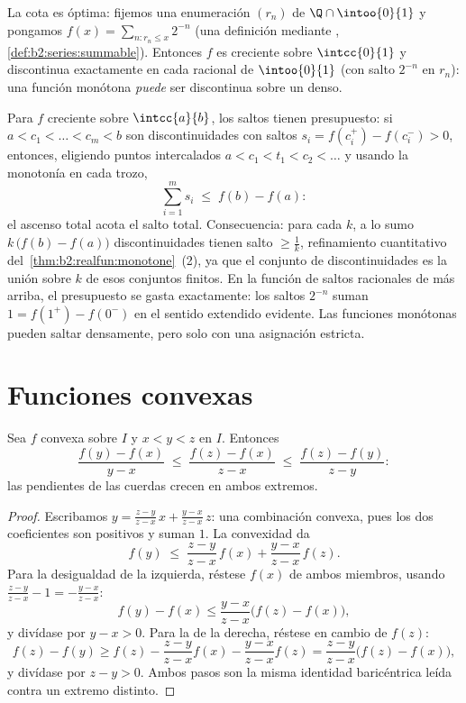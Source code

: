\begin{example}
La cota es óptima: fijemos una enumeración $(r_n)$ de $\Q \cap
\intoo{0}{1}$ y pongamos $f(x) = \sum_{n : r_n \leq x} 2^{-n}$ (una
definición mediante ,
\cref{def:b2:series:summable}). Entonces $f$ es creciente sobre
$\intcc{0}{1}$ y discontinua exactamente en cada racional de
$\intoo{0}{1}$ (con salto $2^{-n}$ en $r_n$): una función monótona
\emph{puede} ser discontinua sobre un  denso.
\end{example}

\begin{example}\label{ex:b2:realfun:jumpbudget}
Para $f$ creciente sobre $\intcc{a}{b}$, los saltos tienen
presupuesto: si $a < c_1 < \dots < c_m < b$ son discontinuidades
con saltos $s_i = f(c_i^+) - f(c_i^-) > 0$, entonces, eligiendo
puntos intercalados $a < c_1 < t_1 < c_2 < \dots$ y usando la
monotonía en cada trozo,
\[
\sum_{i=1}^{m} s_i \;\leq\; f(b) - f(a) :
\]
el ascenso total acota el salto total. Consecuencia: para cada $k$,
a lo sumo $k\,\bigl(f(b) - f(a)\bigr)$ discontinuidades tienen salto
$\geq \frac1k$, refinamiento cuantitativo del~\cref{thm:b2:realfun:monotone}~(2), ya que el conjunto de
discontinuidades es la unión  sobre $k$ de esos conjuntos
finitos. En la función de saltos racionales de más arriba, el
presupuesto se gasta exactamente: los saltos $2^{-n}$ suman $1 =
f(1^+) - f(0^-)$ en el sentido extendido evidente. Las funciones
monótonas pueden saltar densamente, pero solo con una asignación
estricta.
\end{example}

\section{Funciones convexas}

\begin{lemma}\label{lem:b2:realfun:slopes}
Sea $f$ convexa sobre $I$ y $x < y < z$ en $I$. Entonces
\[
\frac{f(y) - f(x)}{y - x}
\;\leq\; \frac{f(z) - f(x)}{z - x}
\;\leq\; \frac{f(z) - f(y)}{z - y} :
\]
las pendientes de las cuerdas crecen en ambos extremos.
\end{lemma}

\begin{proof}
Escribamos $y = \frac{z - y}{z - x}\,x + \frac{y - x}{z - x}\,z$:
una combinación convexa, pues los dos coeficientes son positivos y
suman $1$. La convexidad da
\[
f(y) \;\leq\; \frac{z-y}{z-x}\,f(x) + \frac{y-x}{z-x}\,f(z).
\]
Para la desigualdad de la izquierda, réstese $f(x)$ de ambos
miembros, usando $\frac{z-y}{z-x} - 1 = -\frac{y-x}{z-x}$:
\[
f(y) - f(x) \leq \frac{y - x}{z - x}\bigl(f(z) - f(x)\bigr),
\]
y divídase por $y - x > 0$. Para la de la derecha, réstese en cambio
de $f(z)$:
\[
f(z) - f(y) \geq f(z) - \frac{z-y}{z-x}f(x) -
\frac{y-x}{z-x}f(z)
= \frac{z - y}{z - x}\bigl(f(z) - f(x)\bigr),
\]
y divídase por $z - y > 0$. Ambos pasos son la misma identidad
baricéntrica leída contra un extremo distinto.
\end{proof}

